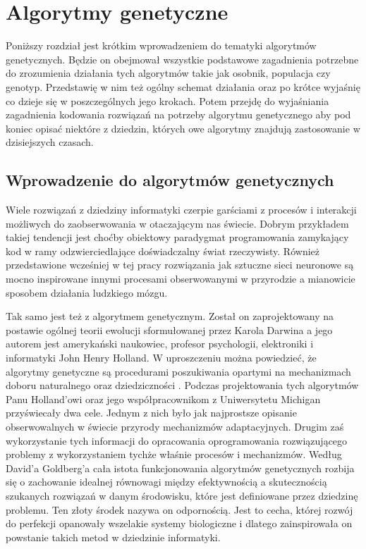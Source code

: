 \documentclass[12pt, oneside, a4paper]{report}
\begin{document}

\chapter{Algorytmy genetyczne}

Poniższy rozdział jest krótkim wprowadzeniem do tematyki algorytmów genetycznych. Będzie on obejmował wszystkie podstawowe zagadnienia potrzebne do zrozumienia działania tych algorytmów takie jak osobnik, populacja czy genotyp. Przedstawię w nim też ogólny schemat działania oraz po krótce wyjaśnię co dzieje się w poszczególnych jego krokach. Potem przejdę do wyjaśniania zagadnienia kodowania rozwiązań na potrzeby algorytmu genetycznego aby pod koniec opisać niektóre z dziedzin, których owe algorytmy znajdują zastosowanie w dzisiejszych czasach.

\section{Wprowadzenie do algorytmów genetycznych}

Wiele rozwiązań z dziedziny informatyki czerpie garściami z procesów i interakcji możliwych do zaobserwowania w otaczającym nas świecie. Dobrym przykładem takiej tendencji jest choćby obiektowy paradygmat programowania zamykający kod w ramy odzwierciedlające doświadczalny świat rzeczywisty. Również przedstawione wcześniej w tej pracy rozwiązania jak sztuczne sieci neuronowe są mocno inspirowane innymi procesami obserwowanymi w przyrodzie a mianowicie sposobem działania ludzkiego mózgu. 

Tak samo jest też z algorytmem genetycznym. Został on zaprojektowany na postawie ogólnej teorii ewolucji sformułowanej przez Karola Darwina a jego autorem jest amerykański naukowiec, profesor psychologii, elektroniki i informatyki John Henry Holland. W uproszczeniu można powiedzieć, że algorytmy genetyczne są procedurami poszukiwania opartymi na mechanizmach doboru naturalnego oraz dziedziczności \citep{goldberg1995algorytmygenetyczne}. Podczas projektowania tych algorytmów Panu Holland'owi oraz jego współpracownikom z Uniwersytetu Michigan przyświecały dwa cele. Jednym z nich było jak najprostsze opisanie obserwowalnych w świecie przyrody mechanizmów adaptacyjnych. Drugim zaś wykorzystanie tych informacji do opracowania oprogramowania rozwiązującego problemy z wykorzystaniem tychże właśnie procesów i mechanizmów. Według David'a Goldberg'a cała istota funkcjonowania algorytmów genetycznych rozbija się o zachowanie idealnej równowagi między efektywnością a skutecznością szukanych rozwiązań w danym środowisku, które jest definiowane przez dziedzinę problemu. Ten złoty środek nazywa on odpornością. Jest to cecha, której rozwój do perfekcji opanowały wszelakie systemy biologiczne i dlatego zainspirowała on powstanie takich metod w dziedzinie informatyki.
\end{document}
